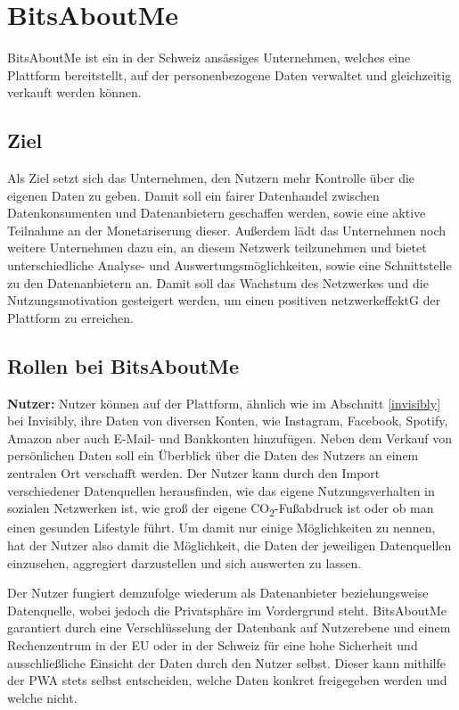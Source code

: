 \section{BitsAboutMe}
BitsAboutMe ist ein in der Schweiz ansässiges Unternehmen, welches eine Plattform bereitstellt, auf der personenbezogene Daten verwaltet und gleichzeitig verkauft werden können.

\subsection{Ziel}
Als Ziel setzt sich das Unternehmen, den Nutzern mehr Kontrolle über die eigenen Daten zu geben. Damit soll ein fairer Datenhandel zwischen Datenkonsumenten und Datenanbietern geschaffen werden, sowie eine aktive Teilnahme an der Monetariserung dieser. Außerdem lädt das Unternehmen noch weitere Unternehmen dazu ein, an diesem Netzwerk teilzunehmen und bietet unterschiedliche Analyse- und Auswertungsmöglichkeiten, sowie eine Schnittstelle zu den Datenanbietern an. Damit soll das Wachstum des Netzwerkes und die Nutzungsmotivation gesteigert werden, um einen positiven \gls{netzwerkeffektG} der Plattform zu erreichen.

\subsection{Rollen bei BitsAboutMe}
\textbf{Nutzer:} Nutzer können auf der Plattform, ähnlich wie im Abschnitt \ref{invisibly} bei Invisibly, ihre Daten von diversen Konten, wie Instagram, Facebook, Spotify, Amazon aber auch E-Mail- und Bankkonten hinzufügen. Neben dem Verkauf von persönlichen Daten soll ein Überblick über die Daten des Nutzers an einem zentralen Ort verschafft werden. Der Nutzer kann durch den Import verschiedener Datenquellen herausfinden, wie das eigene Nutzungsverhalten in sozialen Netzwerken ist, wie groß der eigene CO\textsubscript{2}-Fußabdruck ist oder ob man einen gesunden Lifestyle führt. Um damit nur einige Möglichkeiten zu nennen, hat der Nutzer also damit die Möglichkeit, die Daten der jeweiligen Datenquellen einzusehen, aggregiert darzustellen und sich auswerten zu lassen. \newline

\noindent Der Nutzer fungiert demzufolge wiederum als Datenanbieter beziehungsweise Datenquelle, wobei jedoch die Privatsphäre im Vordergrund steht. BitsAboutMe garantiert durch eine Verschlüsselung der Datenbank auf Nutzerebene und einem Rechenzentrum in der EU oder in der Schweiz für eine hohe Sicherheit und ausschließliche Einsicht der Daten durch den Nutzer selbst. Dieser kann mithilfe der \gls{PWA} stets selbst entscheiden, welche Daten konkret freigegeben werden und welche nicht.\newline

